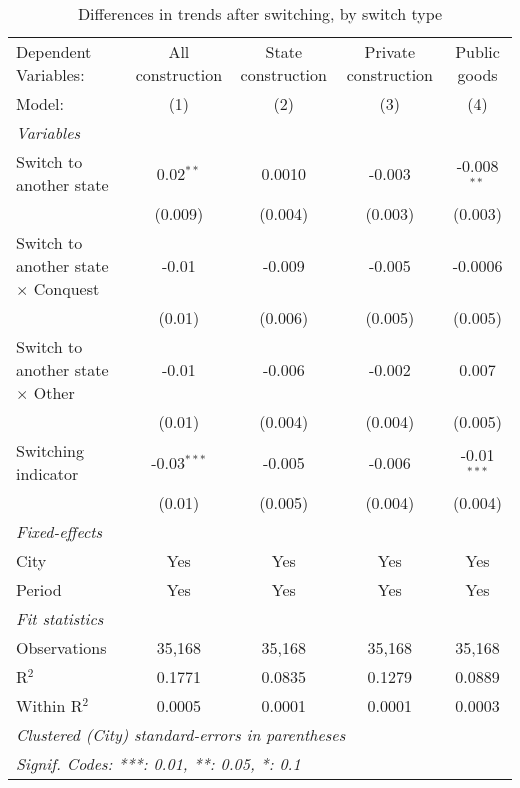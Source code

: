 \begin{table}[htbp]
   \caption{\label{tab:baseline_10y} Differences in trends after switching, by switch type}
   \centering
   \begin{tabular}{lcccc}
      \tabularnewline \midrule \midrule
      Dependent Variables:                       & All construction & State construction & Private construction & Public goods\\  
      Model:                                     & (1)              & (2)                & (3)                  & (4)\\  
      \midrule
      \emph{Variables}\\
      Switch to another state                    & 0.02$^{**}$      & 0.0010             & -0.003               & -0.008$^{**}$\\   
                                                 & (0.009)          & (0.004)            & (0.003)              & (0.003)\\   
      Switch to another state $\times$ Conquest  & -0.01            & -0.009             & -0.005               & -0.0006\\   
                                                 & (0.01)           & (0.006)            & (0.005)              & (0.005)\\   
      Switch to another state $\times$ Other     & -0.01            & -0.006             & -0.002               & 0.007\\   
                                                 & (0.01)           & (0.004)            & (0.004)              & (0.005)\\   
      Switching indicator                        & -0.03$^{***}$    & -0.005             & -0.006               & -0.01$^{***}$\\   
                                                 & (0.01)           & (0.005)            & (0.004)              & (0.004)\\   
      \midrule
      \emph{Fixed-effects}\\
      City                                       & Yes              & Yes                & Yes                  & Yes\\  
      Period                                     & Yes              & Yes                & Yes                  & Yes\\  
      \midrule
      \emph{Fit statistics}\\
      Observations                               & 35,168           & 35,168             & 35,168               & 35,168\\  
      R$^2$                                      & 0.1771           & 0.0835             & 0.1279               & 0.0889\\  
      Within R$^2$                               & 0.0005           & 0.0001             & 0.0001               & 0.0003\\  
      \midrule \midrule
      \multicolumn{5}{l}{\emph{Clustered (City) standard-errors in parentheses}}\\
      \multicolumn{5}{l}{\emph{Signif. Codes: ***: 0.01, **: 0.05, *: 0.1}}\\
   \end{tabular}
   

\end{table}

